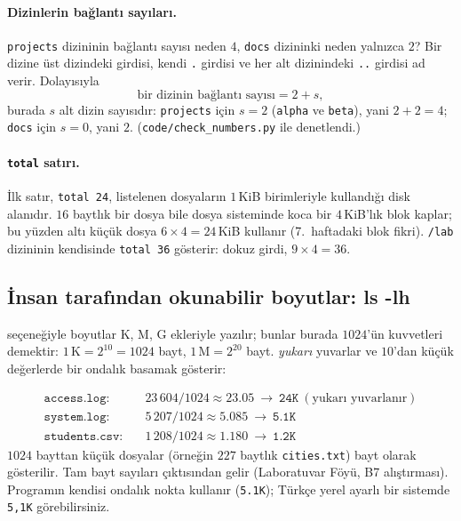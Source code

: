 \paragraph{Dizinlerin bağlantı sayıları.} \texttt{projects} dizininin bağlantı sayısı neden $4$, \texttt{docs} dizininki neden yalnızca $2$? Bir dizine üst dizindeki girdisi, kendi \texttt{.} girdisi ve her alt dizinindeki \texttt{..} girdisi ad verir. Dolayısıyla
\[
\text{bir dizinin bağlantı sayısı} = 2 + s,
\]
burada $s$ alt dizin sayısıdır: \texttt{projects} için $s = 2$ (\texttt{alpha} ve \texttt{beta}), yani $2 + 2 = 4$; \texttt{docs} için $s=0$, yani $2$. (\texttt{code/check\_numbers.py} ile denetlendi.)

\paragraph{\texttt{total} satırı.} İlk satır, \texttt{total 24}, listelenen dosyaların $1$\,KiB birimleriyle kullandığı disk alanıdır. $16$ baytlık bir dosya bile dosya sisteminde koca bir $4$\,KiB'lık blok kaplar; bu yüzden altı küçük dosya $6 \times 4 = 24$\,KiB kullanır (7.\ haftadaki blok fikri). \texttt{\tl/lab} dizininin kendisinde  \texttt{total 36} gösterir: dokuz girdi, $9 \times 4 = 36$.

\subsection{İnsan tarafından okunabilir boyutlar: ls -lh}


 seçeneğiyle boyutlar K, M, G ekleriyle yazılır; bunlar burada $1024$'ün kuvvetleri demektir: $1\,\text{K} = 2^{10} = 1024$ bayt, $1\,\text{M} = 2^{20}$ bayt.  \emph{yukarı} yuvarlar ve $10$'dan küçük değerlerde bir ondalık basamak gösterir:

\begin{example}
\begin{align*}
\texttt{access.log}:&\quad 23\,604 / 1024 \approx 23.05 \ \longrightarrow\ \texttt{24K}\ (\text{yukarı yuvarlanır})\\
\texttt{system.log}:&\quad 5\,207 / 1024 \approx 5.085 \ \longrightarrow\ \texttt{5.1K}\\
\texttt{students.csv}:&\quad 1\,208 / 1024 \approx 1.180 \ \longrightarrow\ \texttt{1.2K}
\end{align*}
$1024$ bayttan küçük dosyalar (örneğin $227$ baytlık \texttt{cities.txt}) bayt olarak gösterilir. Tam bayt sayıları  çıktısından gelir (Laboratuvar Föyü, B7 alıştırması). Programın kendisi ondalık nokta kullanır (\texttt{5.1K}); Türkçe yerel ayarlı bir sistemde \texttt{5,1K} görebilirsiniz.
\end{example}


